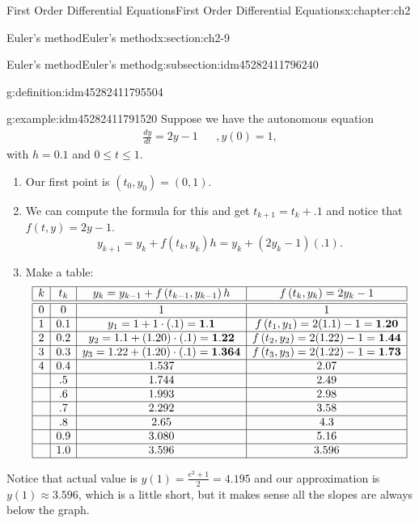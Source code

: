 \documentclass[oneside,10pt,]{book}
\numberwithin{equation}{section}
\numberwithin{equation}{section}
\newcommand{\amp}{&}
\begin{document}
\begin{chapterptx}{First Order Differential Equations}{}{First Order Differential Equations}{}{}{x:chapter:ch2}
\begin{sectionptx}{Euler's method}{}{Euler's method}{}{}{x:section:ch2-9}
\begin{subsectionptx}{Euler's method}{}{Euler's method}{}{}{g:subsection:idm45282411796240}
\begin{definition}{}{g:definition:idm45282411795504}
%
\end{definition}
\begin{example}{}{g:example:idm45282411791520}%
Suppose we have the autonomous equation%
\begin{align*}
\frac{dy}{dt}=2y-1 \amp  \amp ,y(0)=1,
\end{align*}
with \(h=0.1\) and \(0\leq t\leq1\).%
%
\begin{enumerate}
\item{}Our first point is \((t_{0},y_{0})=\left(0,1\right)\).%
\item{}We can compute the formula for this and get \(t_{k+1}=t_{k}+.1\) and notice that \(f\left(t,y\right)=2y-1\).%
\begin{equation*}
y_{k+1}=y_{k}+f\left(t_{k},y_{k}\right)h=y_{k}+\left(2y_{k}-1\right)(.1).
\end{equation*}
%
\item{}Make a table:%
\begin{equation*}
\begin{array}{|c|c|c|c|}
\hline
k \amp t_{k} \amp y_{k}=y_{k-1}+f\left(t_{k-1},y_{k-1}\right)h \amp f\left(t_{k},y_{k}\right)=2y_{k}-1\\
\hline
\hline
0 \amp 0 \amp 1 \amp 1\\
\hline
1 \amp 0.1 \amp y_{1}=1+1\cdot(.1)=\mathbf{1.1} \amp f\left(t_{1},y_{1}\right)=2(1.1)-1=\mathbf{1.20}\\
\hline
2 \amp 0.2 \amp y_{2}=1.1+(1.20)\cdot(.1)=\mathbf{1.22} \amp f\left(t_{2},y_{2}\right)=2(1.22)-1=\mathbf{1.44}\\
\hline
3 \amp 0.3 \amp y_{3}=1.22+(1.20)\cdot(.1)=\mathbf{1.364} \amp f\left(t_{3},y_{3}\right)=2(1.22)-1=\mathbf{1.73}\\
\hline
4 \amp 0.4 \amp 1.537 \amp 2.07\\
\hline
\amp .5 \amp 1.744 \amp 2.49\\
\hline
\amp .6 \amp 1.993 \amp 2.98\\
\hline
\amp .7 \amp 2.292 \amp 3.58\\
\hline
\amp .8 \amp 2.65 \amp 4.3\\
\hline
\amp 0.9 \amp 3.080 \amp 5.16\\
\hline
\amp 1.0 \amp 3.596 \amp 3.596\\
\hline
\end{array}
\end{equation*}
%
\end{enumerate}
Notice that actual value is \(y(1)=\frac{e^{2}+1}{2}=4.195\) and our approximation is \(y(1)\approx3.596\), which is a little short, but it makes sense all the slopes are always below the graph.%

\end{example}
\end{subsectionptx}
\end{sectionptx}
\end{chapterptx}
\end{document}
